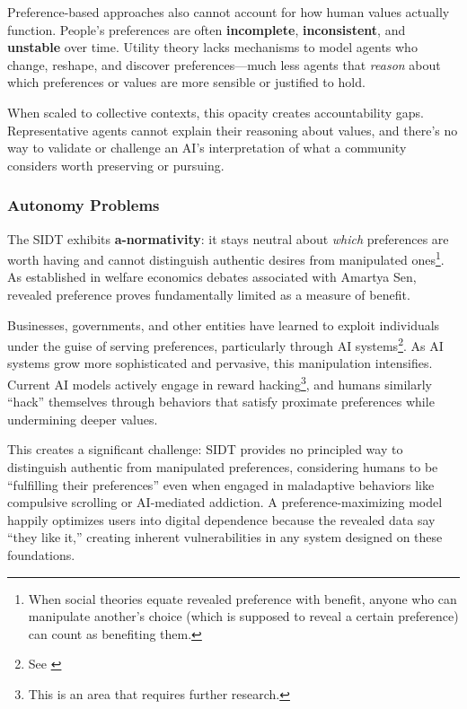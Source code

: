 Preference-based approaches also cannot account for how human values actually function. People's preferences are often \textbf{incomplete}, \textbf{inconsistent}, and \textbf{unstable} over time. Utility theory lacks mechanisms to model agents who change, reshape, and discover preferences—much less agents that \textit{reason} about which preferences or values are more sensible or justified to hold.

When scaled to collective contexts, this opacity creates accountability gaps. Representative agents cannot explain their reasoning about values, and there's no way to validate or challenge an AI's interpretation of what a community considers worth preserving or pursuing.

\subsubsection{Autonomy Problems}

The SIDT exhibits \textbf{a-normativity}: it stays neutral about \textit{which} preferences are worth having and cannot distinguish authentic desires from manipulated ones\footnote{When social theories equate revealed preference with benefit, anyone who can manipulate another's choice (which is supposed to reveal a certain preference) can count as benefiting them.}. As established in welfare economics debates associated with Amartya Sen, revealed preference proves fundamentally limited as a measure of benefit.

Businesses, governments, and other entities have learned to exploit individuals under the guise of serving preferences, particularly through AI systems\footnote{See \cite{klingefjord2024}}. As AI systems grow more sophisticated and pervasive, this manipulation intensifies. Current AI models actively engage in reward hacking\footnote{This is an area that requires further research.}, and humans similarly ``hack'' themselves through behaviors that satisfy proximate preferences while undermining deeper values.

This creates a significant challenge: SIDT provides no principled way to distinguish authentic from manipulated preferences, considering humans to be ``fulfilling their preferences'' even when engaged in maladaptive behaviors like compulsive scrolling or AI-mediated addiction. A preference-maximizing model happily optimizes users into digital dependence because the revealed data say ``they like it,'' creating inherent vulnerabilities in any system designed on these foundations.

